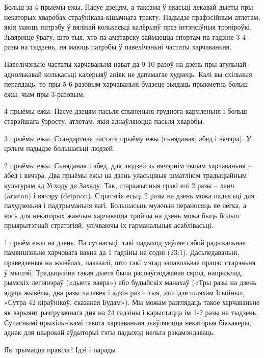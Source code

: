 Больш за 4 прыёмы ежы.
Пасуе дзецям, а таксама ў якасьці лекавай дыеты пры некаторых хваробах страўнікава-кішачнага тракту. Падыдзе прафэсійным атлетам, якія маюць патрэбу ў вялікай колькасьці калёрыяў праз інтэнсіўныя трэніроўкі. Зьвярніце ўвагу, што тыя, хто па-аматарску займаецца спортам па гадзіне 3-4 разы на тыдзень, ня маюць патрэбы ў павелічэньні частаты харчаваньня.

Павелічэньне частаты харчаваньня нават да 9-10 разоў на дзень пры агульнай аднолькавай колькасьці калёрыяў аніяк не дапамагае худнець. Калі вы схільныя пераядаць, то пры 5-6-разовым харчаваньні будзеце зьядаць прыкметна больш ежы, чым пры 3-разовым.

4 прыёмы ежы.
Пасуе дзецям пасьля спыненьня груднога кармленьня і больш старэйшага ўзросту, атлетам, якія аднаўляюцца пасьля хваробы.

3 прыёмы ежы.
Стандартная частата прыёму ежы (сьняданак, абед і вячэра). У цэлым падыдзе большасьці людзей.

2 прыёмы ежы.
Сьняданак і абед, для людзей зь вячэрнім тыпам харчаваньня – абед і вячэра. Два прыёмы ежы на дзень уласьцівыя шматлікім традыцыйным культурам ад Усходу да Захаду. Так, старажытныя грэкі елі 2 разы – ланч (ariston) і вячэру (deipnon). Стратэгія есьці 2 разы на дзень можа падысьці для пахудзеньня і падтрыманьня вагі. Большасьць мужчын пераносяць яе лёгка, а вось для некаторых жанчын харчавацца тройчы на дзень можа быць больш прыярытэтнай стратэгіяй, улічваючы іх гарманальныя асаблівасьці.

1 прыём ежы на дзень.
Па сутнасьці, такі падыход уяўляе сабой радыкальнае памяншэньне харчовага вакна да 1 гадзіны на содні (23:1). Дасьледаваньні, праведзеныя на жывёлах, паказалі, што такі мэтад запавольвае працэс старэньня ў мышэй. Традыцыйна такая дыета была распаўсюджаная сярод, напрыклад, рымскіх легіянэраў («дыета ваяра») або будыйскіх манахаў («Тры разы на дзень ядуць жывёлы, два разы чалавек і адзін раз – тыя, хто ідзе шляхам Ісьціны», «Сутра 42 кіраўнікоў, сказаная Будам»). Мы можам разглядаць такое харчаваньне як варыянт разгрузачнага дня на 24 гадзіны і карыстацца ім 1-2 разы на тыдзень. Сучаснымі прыхільнікамі такога харчаваньня зьяўляюцца некаторыя біяхакеры, аднак для шырокай аўдыторыі гэты падыход нельга рэкамэндаваць.

Як трымацца правіла? Ідэі і парады

